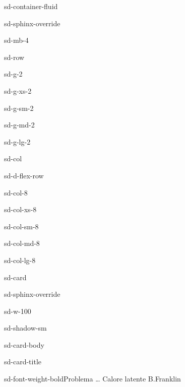 \documentclass[letterpaper,10pt,italian]{jupyterBook}
\begin{document}
\begin{sphinxuseclass}{sd-container-fluid}
\begin{sphinxuseclass}{sd-sphinx-override}
\begin{sphinxuseclass}{sd-mb-4}
\begin{sphinxuseclass}{sd-row}
\begin{sphinxuseclass}{sd-g-2}
\begin{sphinxuseclass}{sd-g-xs-2}
\begin{sphinxuseclass}{sd-g-sm-2}
\begin{sphinxuseclass}{sd-g-md-2}
\begin{sphinxuseclass}{sd-g-lg-2}
\begin{sphinxuseclass}{sd-col}
\begin{sphinxuseclass}{sd-d-flex-row}
\begin{sphinxuseclass}{sd-col-8}
\begin{sphinxuseclass}{sd-col-xs-8}
\begin{sphinxuseclass}{sd-col-sm-8}
\begin{sphinxuseclass}{sd-col-md-8}
\begin{sphinxuseclass}{sd-col-lg-8}
\begin{sphinxuseclass}{sd-card}
\begin{sphinxuseclass}{sd-sphinx-override}
\begin{sphinxuseclass}{sd-w-100}
\begin{sphinxuseclass}{sd-shadow-sm}
\begin{sphinxuseclass}{sd-card-body}
\begin{sphinxuseclass}{sd-card-title}
\begin{sphinxuseclass}{sd-font-weight-bold}Problema … Calore latente \sphinxhyphen{} B.Franklin 
\end{sphinxuseclass}
\end{sphinxuseclass}
\end{sphinxuseclass}
\end{sphinxuseclass}
\end{sphinxuseclass}
\end{sphinxuseclass}
\end{sphinxuseclass}
\end{sphinxuseclass}
\end{sphinxuseclass}
\end{sphinxuseclass}
\end{sphinxuseclass}
\end{sphinxuseclass}
\end{sphinxuseclass}

\end{sphinxuseclass}
\end{sphinxuseclass}
\end{sphinxuseclass}
\end{sphinxuseclass}
\end{sphinxuseclass}
\end{sphinxuseclass}
\end{sphinxuseclass}
\end{sphinxuseclass}
\end{sphinxuseclass}
\end{sphinxuseclass}
\end{document}
